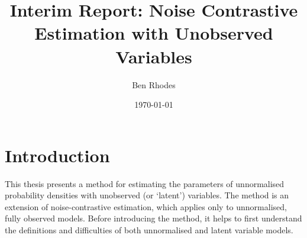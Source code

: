 \documentclass[11pt, oneside]{article}
\title{Interim Report: Noise Contrastive Estimation with Unobserved Variables}
\author{Ben Rhodes}
\date{\today}
\begin{document}
\maketitle

\section{Introduction}

This thesis presents a method for estimating the parameters of unnormalised probability densities with unobserved (or `latent’) variables. The method is an extension of noise-contrastive estimation, which applies only to unnormalised, fully observed models. Before introducing the method, it helps to first understand the definitions and difficulties of both unnormalised and latent variable models.
\end{document}
